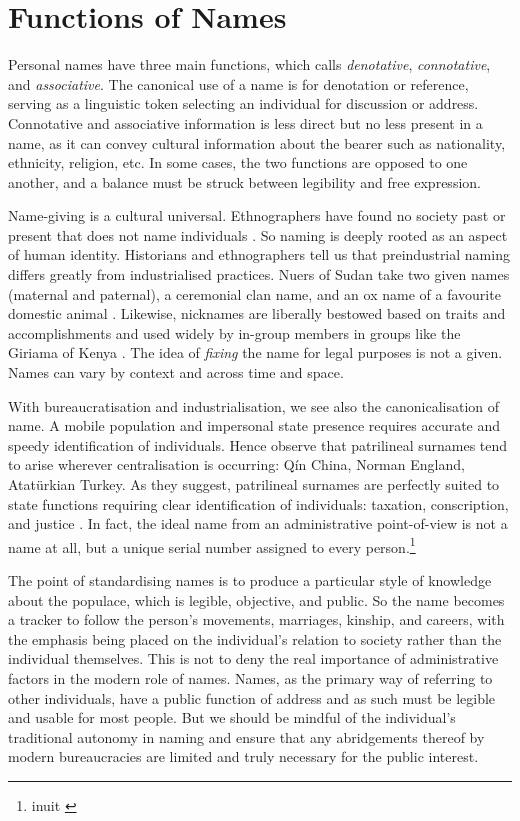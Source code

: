 \section{Functions of Names}

Personal names have three main functions, which \textcite[392]{heymann11} calls
\textit{denotative}, \textit{connotative}, and \textit{associative}. The
canonical use of a name is for denotation or reference, serving as a linguistic
token selecting an individual for discussion or address. Connotative and
associative information is less direct but no less present in a name, as it can
convey cultural information about the bearer such as nationality, ethnicity,
religion, etc. In some cases, the two functions are opposed to one another, and
a balance must be struck between legibility and free expression.

Name-giving is a cultural universal. Ethnographers have found no society past
or present that does not name individuals \parencite{alford87}. So naming is
deeply rooted as an aspect of human identity. Historians and ethnographers tell
us that preindustrial naming differs greatly from industrialised practices.
Nuers of Sudan take two given names (maternal and paternal), a ceremonial clan
name, and an ox name of a favourite domestic animal \parencite{wardhaugh92}.
Likewise, nicknames are liberally bestowed based on traits and accomplishments
and used widely by in-group members in groups like the Giriama of Kenya
\parencite{parkin88} \parencite{wardhaugh92}. The idea of \textit{fixing} the
name for legal purposes is not a given. Names can vary by context and across
time and space.

With bureaucratisation and industrialisation, we see also the canonicalisation
of name. A mobile population and impersonal state presence requires accurate
and speedy identification of individuals. Hence \textcite{scott02} observe that
patrilineal surnames tend to arise wherever centralisation is occurring: Qín
China, Norman England, Atatürkian Turkey. As they suggest, patrilineal surnames
are perfectly suited to state functions requiring clear identification of
individuals: taxation, conscription, and justice \parencite[18]{scott02}. In
fact, the ideal name from an administrative point-of-view is not a name at all,
but a unique serial number assigned to every person.\footnote{inuit
\parencite{scott02}}

The point of standardising names is to produce a particular style of knowledge
about the populace, which is legible, objective, and public. So the name
becomes a tracker to follow the person's movements, marriages, kinship, and
careers, with the emphasis being placed on the individual's relation to society
rather than the individual themselves. This is not to deny the real importance
of administrative factors in the modern role of names. Names, as the primary
way of referring to other individuals, have a public function of address and as
such must be legible and usable for most people. But we should be mindful of
the individual's traditional autonomy in naming and ensure that any
abridgements thereof by modern bureaucracies are limited and truly necessary
for the public interest.

